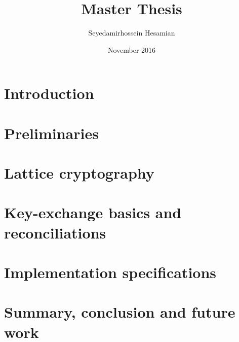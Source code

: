 \documentclass[12pt,titlepage]{report}
\title{Master Thesis}
\author{Seyedamirhossein Hesamian}
\date{November 2016}
\begin{document}
\renewcommand{\contentsname}{TABLE OF CONTENTS}
\renewcommand{\listfigurename}{LIST OF FIGURES}
\renewcommand{\listtablename}{LIST OF TABLES}




% 
\setcounter{page}{2}



\tableofcontents
\listoffigures
\newpage






\doublespacing

\setcounter{page}{0}

\chapter{Introduction}
    

\chapter{Preliminaries}
    
    
    
\chapter{Lattice cryptography}
    
    

\chapter{Key-exchange basics and reconciliations}
    
    
    
    
    
\chapter{Implementation specifications}
    
    

\chapter{Summary, conclusion and future work}
    
\end{document}
